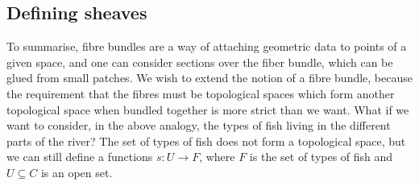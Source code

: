 \subsection{Defining sheaves}
To summarise, fibre bundles are a way of attaching geometric data to
points of a given space, and one can consider sections over the fiber
bundle, which can be glued from small patches. We wish to extend the notion
of a fibre bundle, because the requirement that the fibres must be
topological spaces which form another topological space when bundled
together is more strict than we want. What if we want to consider, in
the above analogy, the types of fish living in the different parts of the
river? The set of types of fish does not form a topological space, but we
can still define a functions $s:U\to F$, where $F$ is the set of types
of fish and $U\subseteq C$ is an open set.

